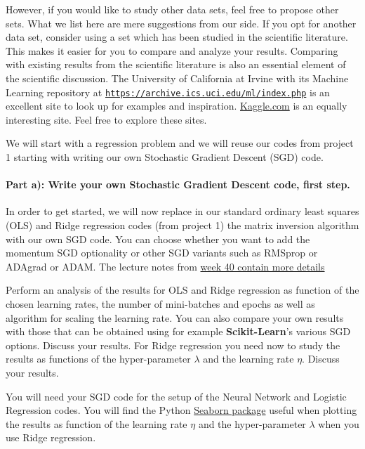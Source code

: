\documentclass[%
oneside,                 %
final,                   %
10pt]{article}
\begin{document}
However, if you would like to study other data sets, feel free to
propose other sets. What we list here are mere suggestions from our
side. If you opt for another data set, consider using a set which
has been studied in the scientific literature. This makes it easier
for you to compare and analyze your results. Comparing with existing results from the scientific literature  is also an essential
element of the scientific discussion.  The University of California at Irvine with its Machine Learning repository at \href{{https://archive.ics.uci.edu/ml/index.php}}{\nolinkurl{https://archive.ics.uci.edu/ml/index.php}} is an excellent site to look up for examples and inspiration. \href{{https://www.kaggle.com/}}{Kaggle.com} is an equally interesting site. Feel free to explore these sites.


We will start with a regression problem and we will reuse our codes from project 1 starting with writing our own Stochastic Gradient Descent (SGD) code. 

\paragraph{Part a): Write your own Stochastic Gradient Descent  code, first step.}
In order to get started, we will now replace in our standard ordinary
least squares (OLS) and Ridge regression codes (from project 1) the matrix inversion
algorithm with our own SGD code. You can choose whether you want to
add the momentum SGD optionality or other SGD variants such as RMSprop
or ADAgrad or ADAM. The lecture notes from \href{{https://compphysics.github.io/MachineLearning/doc/pub/week40/html/week40.html}}{week 40 contain more
details}

Perform an analysis of the results for OLS and Ridge regression as
function of the chosen learning rates, the number of mini-batches and
epochs as well as algorithm for scaling the learning rate. You can
also compare your own results with those that can be obtained using
for example \textbf{Scikit-Learn}'s various SGD options.  Discuss your
results. For Ridge regression you need now to study the results as functions of  the hyper-parameter $\lambda$ and 
the learning rate $\eta$.  Discuss your results.

You will need your SGD code for the setup of the Neural Network and Logistic Regression codes. You will find the Python \href{{https://seaborn.pydata.org/generated/seaborn.heatmap.html}}{Seaborn package} useful when plotting the results as function of the learning rate $\eta$ and the hyper-parameter $\lambda$ when you use Ridge regression.
\end{document}
